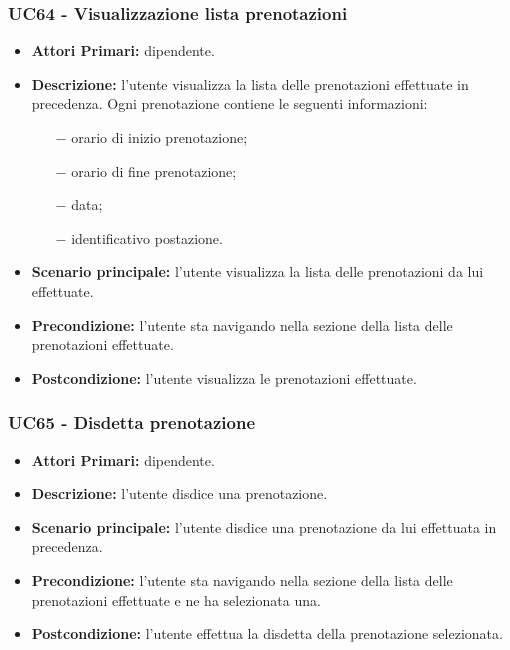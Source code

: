 \subsubsection{ UC64 - Visualizzazione lista prenotazioni}
\begin{itemize}
	\item\textbf{Attori Primari:} dipendente.
	\item\textbf{Descrizione:} l'utente visualizza la lista delle prenotazioni effettuate in precedenza. Ogni prenotazione contiene le seguenti informazioni:
	\begin{itemize}
		\item[$-$] orario di inizio prenotazione;
		\item[$-$] orario di fine prenotazione;
		\item[$-$] data;
		\item[$-$] identificativo postazione.
	\end{itemize}
	\item\textbf{Scenario principale:} l’utente visualizza la lista delle prenotazioni da lui effettuate.
	\item\textbf{Precondizione:} l'utente sta navigando nella sezione della lista delle prenotazioni effettuate.
	\item\textbf{Postcondizione:} l’utente visualizza le prenotazioni effettuate.
\end{itemize}

\subsubsection{ UC65 - Disdetta prenotazione}
\begin{itemize}
	\item\textbf{Attori Primari:} dipendente.
	\item\textbf{Descrizione:} l’utente disdice una prenotazione. 
	\item\textbf{Scenario principale:} l’utente disdice una prenotazione da lui effettuata in precedenza.
	\item\textbf{Precondizione:} l'utente sta navigando nella sezione della lista delle prenotazioni effettuate e ne ha selezionata una.
	\item\textbf{Postcondizione:} l’utente effettua la disdetta della prenotazione selezionata.
\end{itemize}

